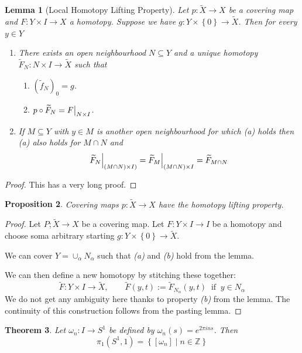 \documentclass[11pt]{article}
\newcommand{\defeq}{:=}
\newcommand\restr[2]{{%
  \left.\kern-\nulldelimiterspace %
  #1 %
  \vphantom{\big|} %
  \right|_{#2} %
  }}
\newcommand{\relmiddle}[1]{\mathrel{}\middle#1\mathrel{}}
\newcommand{\rmv}{\relmiddle|}
\newcommand{\Z}{\mathbb{Z}}
\newtheorem{theorem}{Theorem}[section]
\newtheorem{prop}[theorem]{Proposition}
\newtheorem{lemma}[theorem]{Lemma}
\begin{document}
\begin{lemma}[Local Homotopy Lifting Property]
Let $p:\widetilde{X}\to X$ be a covering map and $F:Y\times I \to X$ a homotopy.
Suppose we have $g:Y\times\left\{0\right\}\to \widetilde{X}$.
Then for every $y\in Y$
\begin{enumerate}[label=(\alph*)]
	\item There exists an open neighbourhood $N\subseteq Y$ and a unique homotopy $\widetilde{F}_N:N\times I \to \widetilde{X}$ such that
		\begin{enumerate}[label=(\roman*)]
			\item $(\widetilde{f}_N)_0=g$.
			\item $p\circ\widetilde{F}_N=\restr{F}{N\times I}$.
		\end{enumerate}
	\item If $M\subseteq Y$ with $y\in M$ is another open neighbourhood for which \textit{(a)} holds then \textit{(a)} also holds for $M\cap N$ and
		\[
			\restr{\widetilde{F}_N}{(M\cap N)\times I)}=\restr{\widetilde{F}_M}{(M\cap N)\times I}=\widetilde{F}_{M\cap N}
		\]
\end{enumerate}
\end{lemma}
\begin{proof}
This has a very long proof.
\end{proof}

\begin{prop}
Covering maps $p:\widetilde{X}\to X$ have the homotopy lifting property.
\end{prop}

\begin{proof}
Let $P;\widetilde{X}\to X$ be a covering map.
Let $F:Y\times I \to I$ be a homotopy and choose soma arbitrary starting $g:Y\times\left\{0\right\}\to\widetilde{X}$.

We can cover $Y=\cup_\alpha N_\alpha$ such that \textit{(a)} and \textit{(b)} hold from the lemma.

We can then define a new homotopy by stitching these together:
\[
	\widetilde{F}:Y\times I \to \widetilde{X},\quad\quad \widetilde{F}(y, t)\defeq \widetilde{F}_{N_\alpha}(y, t)\;\;\text{if}\;\; y\in N_\alpha
\]
We do not get any ambiguity here thanks to property \textit{(b)} from the lemma.
The continuity of this construction follows from the pasting lemma.
\end{proof}

\begin{theorem}
Let $\omega_n:I\to S^1$ be defined by $\omega_n(s)=e^{2\pi i n s}$. Then
\[
	\pi_1(S^1,1)=\left\{[\omega_n] \rmv n\in\Z\right\}
\]
\end{theorem}
\end{document}
